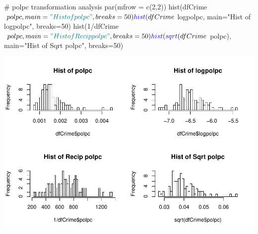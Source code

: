\documentclass[]{article}
\newenvironment{Shaded}{}{}
\newcommand{\CommentTok}[1]{\textcolor[rgb]{0.00,0.50,0.00}{#1}}
\newcommand{\DataTypeTok}[1]{#1}
\newcommand{\DecValTok}[1]{#1}
\newcommand{\KeywordTok}[1]{\textcolor[rgb]{0.00,0.00,1.00}{#1}}
\newcommand{\NormalTok}[1]{#1}
\newcommand{\OperatorTok}[1]{#1}
\newcommand{\StringTok}[1]{\textcolor[rgb]{0.00,0.50,0.50}{#1}}
\begin{document}
\begin{Shaded}
\begin{Highlighting}[]
\CommentTok{# polpc transformation analysis }
\KeywordTok{par}\NormalTok{(}\DataTypeTok{mfrow =} \KeywordTok{c}\NormalTok{(}\DecValTok{2}\NormalTok{,}\DecValTok{2}\NormalTok{))}
\KeywordTok{hist}\NormalTok{(dfCrime}\OperatorTok{$}\NormalTok{polpc, }\DataTypeTok{main=}\StringTok{"Hist of polpc"}\NormalTok{, }\DataTypeTok{breaks=}\DecValTok{50}\NormalTok{)}
\KeywordTok{hist}\NormalTok{(dfCrime}\OperatorTok{$}\NormalTok{logpolpc, }\DataTypeTok{main=}\StringTok{"Hist of logpolpc"}\NormalTok{, }\DataTypeTok{breaks=}\DecValTok{50}\NormalTok{)}
\KeywordTok{hist}\NormalTok{(}\DecValTok{1}\OperatorTok{/}\NormalTok{dfCrime}\OperatorTok{$}\NormalTok{polpc, }\DataTypeTok{main=}\StringTok{"Hist of Recip polpc"}\NormalTok{, }\DataTypeTok{breaks=}\DecValTok{50}\NormalTok{)}
\KeywordTok{hist}\NormalTok{(}\KeywordTok{sqrt}\NormalTok{(dfCrime}\OperatorTok{$}\NormalTok{polpc), }\DataTypeTok{main=}\StringTok{"Hist of Sqrt polpc"}\NormalTok{, }\DataTypeTok{breaks=}\DecValTok{50}\NormalTok{)}
\end{Highlighting}
\end{Shaded}

\includegraphics{Bagnard_Gaustad_Hartman_Leung_Lab_3_files/figure-latex/unnamed-chunk-82-1.pdf}
\end{document}

